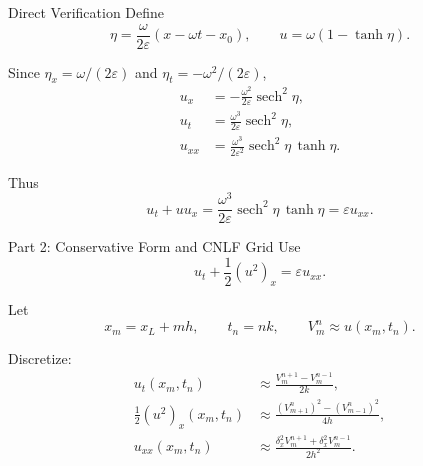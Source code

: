 \documentclass[aspectratio=169,11pt]{beamer}
\begin{document}
\begin{frame}{Direct Verification}
    Define
    \begin{equation}
        \eta=\frac{\omega}{2\varepsilon}(x-\omega t-x_0),
        \qquad
        u=\omega(1-\tanh\eta).
    \end{equation}

    Since $\eta_x=\omega/(2\varepsilon)$ and $\eta_t=-\omega^2/(2\varepsilon)$,
    \begin{align}
        u_x&=-\frac{\omega^2}{2\varepsilon}\operatorname{sech}^2\eta,\\
        u_t&=\frac{\omega^3}{2\varepsilon}\operatorname{sech}^2\eta,\\
        u_{xx}&=\frac{\omega^3}{2\varepsilon^2}
        \operatorname{sech}^2\eta\,\tanh\eta.
    \end{align}

    Thus
    \begin{equation}
        u_t+u u_x
        =
        \frac{\omega^3}{2\varepsilon}
        \operatorname{sech}^2\eta\,\tanh\eta
        =
        \varepsilon u_{xx}.
    \end{equation}
\end{frame}

\begin{frame}{Part 2: Conservative Form and CNLF Grid}
    Use
    \begin{equation}
        u_t+\frac12(u^2)_x=\varepsilon u_{xx}.
    \end{equation}

    Let
    \begin{equation}
        x_m=x_L+mh,\qquad t_n=nk,\qquad V_m^n\approx u(x_m,t_n).
    \end{equation}

    Discretize:
    \begin{align}
        u_t(x_m,t_n)
        &\approx \frac{V_m^{n+1}-V_m^{n-1}}{2k},\\
        \frac12(u^2)_x(x_m,t_n)
        &\approx
        \frac{(V_{m+1}^n)^2-(V_{m-1}^n)^2}{4h},\\
        u_{xx}(x_m,t_n)
        &\approx
        \frac{\delta_x^2V_m^{n+1}+\delta_x^2V_m^{n-1}}{2h^2}.
    \end{align}
\end{frame}
\end{document}
